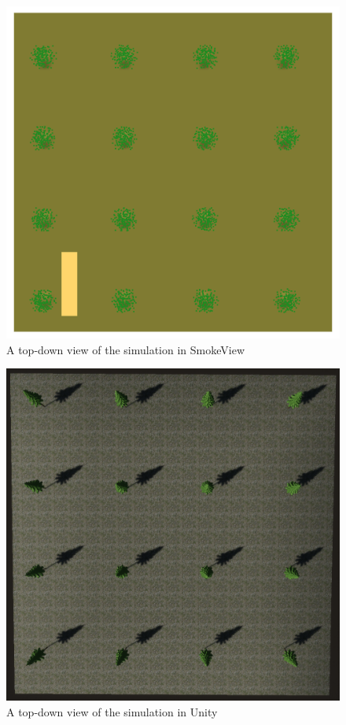 \begin{figure}
\centering
\includegraphics[scale=.3]{Figures/TopDownSMV.png}
\decoRule
\caption[Top Down SmokeView View]{A top-down view of the simulation in SmokeView }
\label{fig:CFDTopDownSmokeview}
\end{figure}
\begin{figure}
\centering
\includegraphics[scale=.3]{Figures/Topdown Unity.png}
\decoRule
\caption[Top Down Unity]{A top-down view of the simulation in Unity}
\label{fig:CFDTopDownUnity}
\end{figure}

